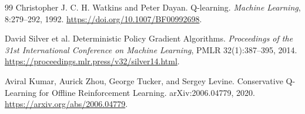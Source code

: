 \documentclass[UTF8,12pt,a4paper,fontset=fandol]{ctexbook}
\begin{document}
\begin{thebibliography}{99}
Christopher J. C. H. Watkins and Peter Dayan.
Q-learning.
\emph{Machine Learning}, 8:279--292, 1992.
\url{https://doi.org/10.1007/BF00992698}.

David Silver et al.
Deterministic Policy Gradient Algorithms.
\emph{Proceedings of the 31st International Conference on Machine Learning}, PMLR 32(1):387--395, 2014.
\url{https://proceedings.mlr.press/v32/silver14.html}.

Aviral Kumar, Aurick Zhou, George Tucker, and Sergey Levine.
Conservative Q-Learning for Offline Reinforcement Learning.
arXiv:2006.04779, 2020.
\url{https://arxiv.org/abs/2006.04779}.

\end{thebibliography}
\end{document}
